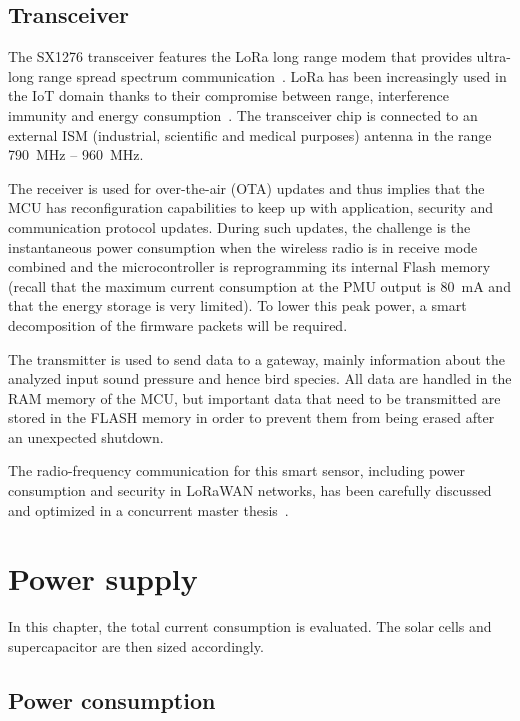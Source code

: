 \documentclass{EPL-master-thesis-covers-EN}
\begin{document}
\section{Transceiver}

The SX1276 transceiver features the LoRa long range modem that provides ultra-long range spread spectrum communication~\cite{SX1276}. LoRa has been increasingly used in the IoT domain thanks to their compromise between range, interference immunity and energy consumption~\cite{SINHA201714}. The transceiver chip is connected to an external ISM (industrial, scientific and medical purposes) antenna in the range \SI{790}{MHz} -- \SI{960}{MHz}.

The receiver is used for over-the-air (OTA) updates and thus implies that the MCU has reconfiguration capabilities to keep up with application, security and communication protocol updates. During such updates, the challenge is the instantaneous power consumption when the wireless radio is in receive mode combined and the microcontroller is reprogramming its internal Flash memory (recall that the maximum current consumption at the PMU output is \SI{80}{mA} and that the energy storage is very limited). To lower this peak power, a smart decomposition of the firmware packets will be required.

The transmitter is used to send data to a gateway, mainly information about the analyzed input sound pressure and hence bird species. All data are handled in the RAM memory of the MCU, but important data that need to be transmitted are stored in the FLASH memory in order to prevent them from being erased after an unexpected shutdown.

The radio-frequency communication for this smart sensor, including power consumption and security in LoRaWAN networks, has been carefully discussed and optimized in a concurrent master thesis~\cite{Hess2020}.


\chapter{Power supply}

In this chapter, the total current consumption is evaluated. The solar cells and supercapacitor are then sized accordingly.

\section{Power consumption}
\label{section:power_consumption}
\end{document}
